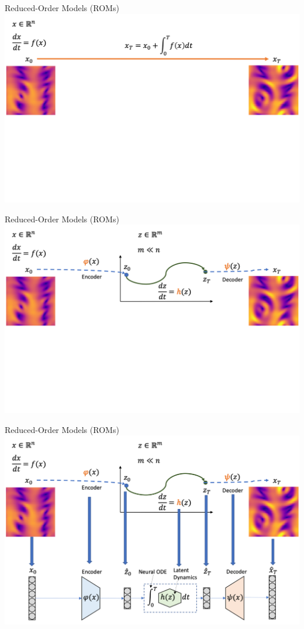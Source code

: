 \documentclass[8pt]{beamer}
\begin{document}
\begin{frame}{Reduced-Order Models (ROMs)}
\includegraphics[width=\textwidth]{Figures/roms_2}
\end{frame}

\begin{frame}{Reduced-Order Models (ROMs)}
\includegraphics[width=\textwidth]{Figures/roms_3}
\end{frame}

\begin{frame}{Reduced-Order Models (ROMs)}
\includegraphics[width=\textwidth]{Figures/roms_4}
\end{frame}
\end{document}
